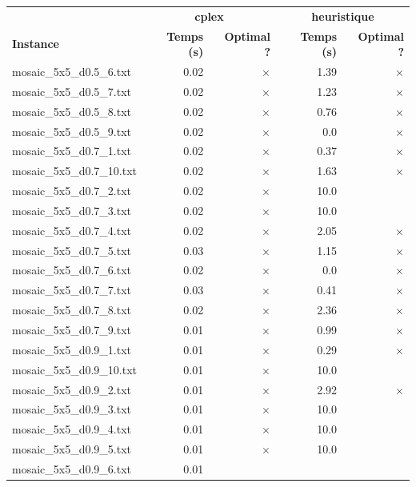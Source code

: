 \documentclass{article}
\begin{document}
\newpage
\begin{center}
\renewcommand{\arraystretch}{1.4} 
 \begin{tabular}{lrrrr}
	\hline
 & \multicolumn{2}{c}{\textbf{cplex}} & \multicolumn{2}{c}{\textbf{heuristique}}\\
\textbf{Instance}  & \textbf{Temps (s)} & \textbf{Optimal ?}  & \textbf{Temps (s)} & \textbf{Optimal ?} \\\hline

mosaic\_5x5\_d0.5\_6.txt & 0.02 & 
$\times$
 & 1.39 & 
$\times$
\\
mosaic\_5x5\_d0.5\_7.txt & 0.02 & 
$\times$
 & 1.23 & 
$\times$
\\
mosaic\_5x5\_d0.5\_8.txt & 0.02 & 
$\times$
 & 0.76 & 
$\times$
\\
mosaic\_5x5\_d0.5\_9.txt & 0.02 & 
$\times$
 & 0.0 & 
$\times$
\\
mosaic\_5x5\_d0.7\_1.txt & 0.02 & 
$\times$
 & 0.37 & 
$\times$
\\
mosaic\_5x5\_d0.7\_10.txt & 0.02 & 
$\times$
 & 1.63 & 
$\times$
\\
mosaic\_5x5\_d0.7\_2.txt & 0.02 & 
$\times$
 & 10.0 & 
\\
mosaic\_5x5\_d0.7\_3.txt & 0.02 & 
$\times$
 & 10.0 & 
\\
mosaic\_5x5\_d0.7\_4.txt & 0.02 & 
$\times$
 & 2.05 & 
$\times$
\\
mosaic\_5x5\_d0.7\_5.txt & 0.03 & 
$\times$
 & 1.15 & 
$\times$
\\
mosaic\_5x5\_d0.7\_6.txt & 0.02 & 
$\times$
 & 0.0 & 
$\times$
\\
mosaic\_5x5\_d0.7\_7.txt & 0.03 & 
$\times$
 & 0.41 & 
$\times$
\\
mosaic\_5x5\_d0.7\_8.txt & 0.02 & 
$\times$
 & 2.36 & 
$\times$
\\
mosaic\_5x5\_d0.7\_9.txt & 0.01 & 
$\times$
 & 0.99 & 
$\times$
\\
mosaic\_5x5\_d0.9\_1.txt & 0.01 & 
$\times$
 & 0.29 & 
$\times$
\\
mosaic\_5x5\_d0.9\_10.txt & 0.01 & 
$\times$
 & 10.0 & 
\\
mosaic\_5x5\_d0.9\_2.txt & 0.01 & 
$\times$
 & 2.92 & 
$\times$
\\
mosaic\_5x5\_d0.9\_3.txt & 0.01 & 
$\times$
 & 10.0 & 
\\
mosaic\_5x5\_d0.9\_4.txt & 0.01 & 
$\times$
 & 10.0 & 
\\
mosaic\_5x5\_d0.9\_5.txt & 0.01 & 
$\times$
 & 10.0 & 
\\
mosaic\_5x5\_d0.9\_6.txt & 0.01 & 

\end{tabular}
\end{center}
\end{document}
